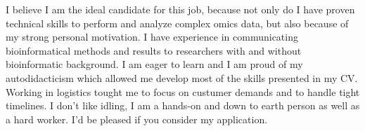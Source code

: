 \documentclass[11pt, a4paper]{awesome-cv}
\begin{document}
\begin{cvletter}
I believe I am the ideal candidate for this job, because not only do I have proven technical skills to perform and analyze complex omics data, but also because of my strong personal motivation.
I have experience in communicating bioinformatical methods and results to researchers with and without bioinformatic background.
I am eager to learn and I am proud of my autodidacticism which allowed me develop most of the skills presented in my CV.
Working in logistics tought me to focus on custumer demands and to handle tight timelines.
I don't like idling, I am a hands-on and down to earth person as well as a hard worker.
I'd be pleased if you consider my application.

\end{cvletter}


\makeletterclosing
\end{document}
